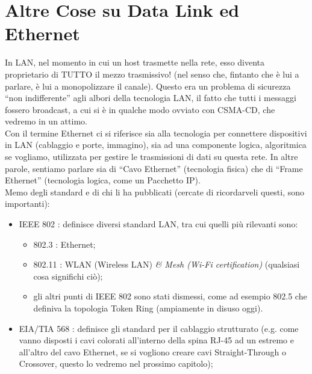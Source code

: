 \section*{Altre Cose su Data Link ed Ethernet}
\noindent In LAN, nel momento in cui un host trasmette nella rete, esso diventa proprietario di TUTTO il mezzo trasmissivo! (nel senso che, fintanto che è lui a parlare, è lui a monopolizzare il canale). Questo era un problema di sicurezza ``non indifferente'' agli albori della tecnologia LAN, il fatto che tutti i messaggi fossero broadcast, a cui si è in qualche modo ovviato con CSMA-CD, che vedremo in un attimo.\\
\noindent Con il termine Ethernet ci si riferisce sia alla tecnologia per connettere dispositivi in LAN (cablaggio e porte, immagino), sia ad una componente logica, algoritmica se vogliamo, utilizzata per gestire le trasmissioni di dati su questa rete. In altre parole, sentiamo parlare sia di ``Cavo Ethernet'' (tecnologia fisica) che di ``Frame Ethernet'' (tecnologia logica, come un Pacchetto IP).\\

\noindent Memo degli standard e di chi li ha pubblicati (cercate di ricordarveli questi, sono importanti):
\begin{itemize}
    \item IEEE 802 : definisce diversi standard LAN, tra cui quelli più rilevanti sono:
    \begin{itemize}
        \item 802.3 : Ethernet;
        \item 802.11 : WLAN (Wireless LAN) \textit{\& Mesh (Wi-Fi certification)} (qualsiasi cosa significhi ciò);
        \item gli altri punti di IEEE 802 sono stati dismessi, come ad esempio 802.5 che definiva la topologia Token Ring (ampiamente in disuso oggi).
    \end{itemize}
    \item EIA/TIA 568 : definisce gli standard per il cablaggio strutturato (e.g. come vanno disposti i cavi colorati all'interno della spina RJ-45 ad un estremo e all'altro del cavo Ethernet, se si vogliono creare cavi Straight-Through o Crossover, questo lo vedremo nel prossimo capitolo);
\end{itemize}

